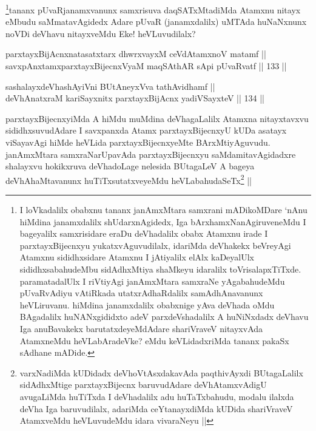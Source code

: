 \begin{artha}
\footnote[3]{I loVkadalilx obabxnu tananx janAmxMtara samxrani mADikoMDare `nAnu hiMdina janamxdalilx shUdarxnAgidedx, Iga bArxhamxNanAgiruveneMdu I bageyalilx samxrisidare eraDu deVhadalilx obabx Atamxnu irade I parxtayxBijecnxyu yukatxvAguvudilalx, idariMda deVhakekx beVreyAgi Atamxnu sididhxsidare Atamxnu I jAtiyalilx elAlx kaDeyalUlx sididhxsabahudeMbu sidAdhxMtiya shaMkeyu idaralilx toVrisalapxTiTxde. paramatadalUlx I riVtiyAgi janAmxMtara samxraNe yAgabahudeMdu pUvaRvAdiyu vAtiRkada utatxrAdhaRdalilx samAdhAnavanunx heVLiruvanu. hiMdina janamxdalilx obabxnige yAva deVhada oMdu BAgadalilx huNANxgididxto adeV parxdeVshadalilx A huNiNxdadx deVhavu Iga anuBavakekx barutatxdeyeMdAdare shariVraveV nitayxvAda AtamxneMdu heVLabAradeVke? eMdu keVLidadxriMda tananx pakaSx sAdhane mADide.}tananx pUvaRjanamxvanunx samxrisuva daqSATxMtadiMda Atamxnu nitayx eMbudu saMmatavAgidedx Adare pUvaR (janamxdalilx) uMTAda huNaNxnunx noVDi deVhavu nitayxveMdu Eke! heVLuvudilalx?
\end{artha}

\begin{shl}
parxtayxBijAcnxnatasatxtarx dhwrxvayxM ceVdAtamxnoV matamf ||  \\
savxpAnxtamxparxtayxBijecnxVyaM maqSAthAR sA\s pi pUvaRvatf ||  133 ||  
\end{shl}
				
\begin{shl}
sashalayxdeVhashAyiVni BUtAneyxVva tathAvidhamf || \\
deVhAnatxraM kariSayxnitx parxtayxBijAcnx yadiVSayxteV ||  134 ||  
\end{shl}

\begin{artha}
parxtayxBijecnxyiMda A hiMdu muMdina deVhagaLalilx Atamxna nitayxtavxvu sididhxsuvudAdare I savxpanxda Atamx parxtayxBijecnxyU kUDa asatayx viSayavAgi hiMde heVLida parxtayxBijecnxyeMte BArxMtiyAguvudu. janAmxMtara samxraNarUpavAda parxtayxBijecnxyu saMdamitavAgidadxre shalayxvu hokikxruva deVhadoLage nelesida BUtagaLeV A bageya deVhAhaMtavanunx huTiTxsutatxveyeMdu heVLabahudaSeTx\footnote{varxNadiMda kUDidadx deVhoVtAsxdakavAda paqthivAyxdi BUtagaLalilx sidAdhxMtige parxtayxBijecnx baruvudAdare deVhAtamxvAdigU avugaLiMda huTiTxda I deVhadalilx adu huTaTxbahudu, modalu ilalxda deVha Iga baruvudilalx, adariMda ceYtanayxdiMda kUDida shariVraveV AtamxveMdu heVLuvudeMdu idara vivaraNeyu ||} ||
\end{artha}

